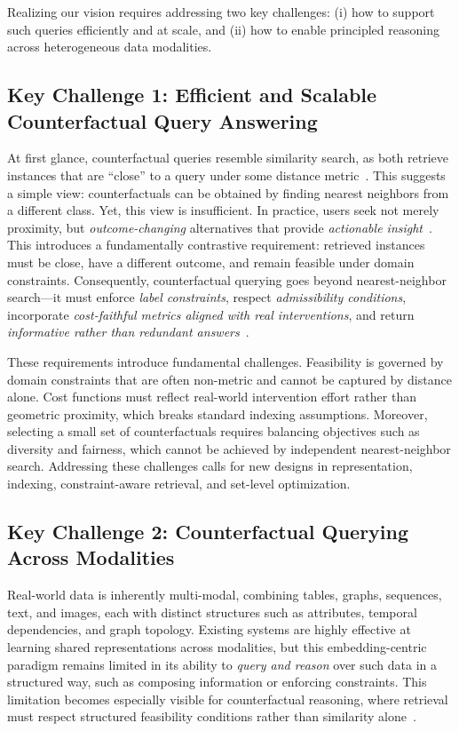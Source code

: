 Realizing our vision requires addressing two key challenges: (i) how to support such queries efficiently and at scale, and (ii) how to enable principled reasoning across heterogeneous data modalities.

\subsection{Key Challenge 1: Efficient and Scalable Counterfactual Query Answering}

At first glance, counterfactual queries resemble similarity search, as both retrieve instances that are ``close'' to a query under some distance metric~\cite{chaves2001searching,indyk1998approximate,malkov2020efficient}. This suggests a simple view: counterfactuals can be obtained by finding nearest neighbors from a different class. Yet, this view is insufficient. In practice, users seek not merely proximity, but \emph{outcome-changing} alternatives that provide \emph{actionable insight}~\cite{lipton1990contrastive,miller2019explanation,shang2022whyami,bucinca2025contrastive}. This introduces a fundamentally contrastive requirement: retrieved instances must be close, have a different outcome, and remain feasible under domain constraints. Consequently, counterfactual querying goes beyond nearest-neighbor search—it must enforce \emph{label constraints}, respect \emph{admissibility conditions}, incorporate \emph{cost-faithful metrics aligned with real interventions}, and return \emph{informative rather than redundant answers}~\cite{cherumanal2025diversification}.

These requirements introduce fundamental challenges. Feasibility is governed by domain constraints that are often non-metric and cannot be captured by distance alone. Cost functions must reflect real-world intervention effort rather than geometric proximity, which breaks standard indexing assumptions. Moreover, selecting a small set of counterfactuals requires balancing objectives such as diversity and fairness, which cannot be achieved by independent nearest-neighbor search. Addressing these challenges calls for new designs in representation, indexing, constraint-aware retrieval, and set-level optimization.

\subsection{Key Challenge 2: Counterfactual Querying Across Modalities}
Real-world data is inherently multi-modal, combining tables, graphs, sequences, text, and images, each with distinct structures such as attributes, temporal dependencies, and graph topology. Existing systems are highly effective at learning shared representations across modalities, but this embedding-centric paradigm remains limited in its ability to \emph{query and reason} over such data in a structured way, such as composing information or enforcing constraints. This limitation becomes especially visible for counterfactual reasoning, where retrieval must respect structured feasibility conditions rather than similarity alone~\cite{wachter2017counterfactual}.

